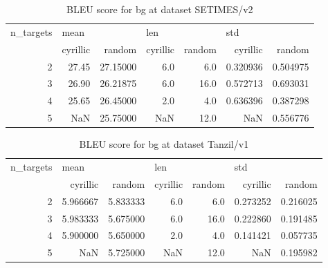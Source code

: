 \begin{table}[h]
\begin{tabular}{rrrrrrr}
\toprule
n\_targets & \multicolumn{2}{l}{mean} & \multicolumn{2}{l}{len} & \multicolumn{2}{l}{std} \\
          & cyrillic &    random & cyrillic & random &  cyrillic &    random \\
\midrule
        2 &    27.45 &  27.15000 &      6.0 &    6.0 &  0.320936 &  0.504975 \\
        3 &    26.90 &  26.21875 &      6.0 &   16.0 &  0.572713 &  0.693031 \\
        4 &    25.65 &  26.45000 &      2.0 &    4.0 &  0.636396 &  0.387298 \\
        5 &      NaN &  25.75000 &      NaN &   12.0 &       NaN &  0.556776 \\
\bottomrule
\end{tabular}

\caption{BLEU score for  bg at dataset SETIMES/v2 }
\label{ table:bg/SETIMES/v2 }
\end{table}

\begin{table}[h]
\begin{tabular}{rrrrrrr}
\toprule
n\_targets & \multicolumn{2}{l}{mean} & \multicolumn{2}{l}{len} & \multicolumn{2}{l}{std} \\
          &  cyrillic &    random & cyrillic & random &  cyrillic &    random \\
\midrule
        2 &  5.966667 &  5.833333 &      6.0 &    6.0 &  0.273252 &  0.216025 \\
        3 &  5.983333 &  5.675000 &      6.0 &   16.0 &  0.222860 &  0.191485 \\
        4 &  5.900000 &  5.650000 &      2.0 &    4.0 &  0.141421 &  0.057735 \\
        5 &       NaN &  5.725000 &      NaN &   12.0 &       NaN &  0.195982 \\
\bottomrule
\end{tabular}

\caption{BLEU score for  bg at dataset Tanzil/v1 }
\label{ table:bg/Tanzil/v1 }
\end{table}

